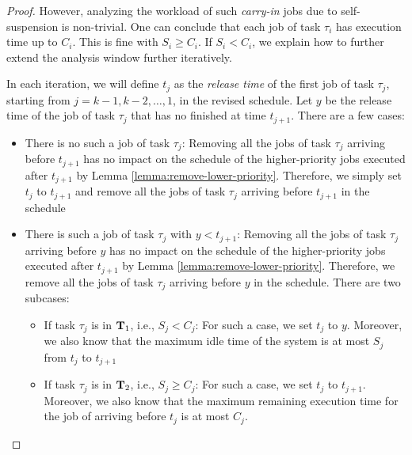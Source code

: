\begin{proof}
However, analyzing the workload of such \emph{carry-in} jobs due to self-suspension is non-trivial. One can conclude that each job of task $\tau_i$ has execution time up to $C_i$. This is fine with $S_i \geq C_i$. If $S_i < C_i$, we explain how to further extend the analysis window further iteratively. 


In each iteration, we will define $t_j$ as the \emph{release time} of the first job of task $\tau_j$, starting from $j=k-1, k-2, \ldots, 1$, in the revised schedule. Let $y$ be the release time of the job of task $\tau_j$ that has no finished at time $t_{j+1}$. There are a few cases:
\begin{itemize}
\item There is no such a job of task $\tau_j$: Removing all the jobs of task $\tau_j$ arriving before $t_{j+1}$ has no impact on the schedule of the higher-priority jobs executed after $t_{j+1}$ by Lemma \ref{lemma:remove-lower-priority}. Therefore, we simply set $t_j$ to $t_{j+1}$ and remove all the jobs of task $\tau_j$ arriving before $t_{j+1}$ in the schedule
\item There is such a job of task $\tau_j$ with $y < t_{j+1}$:  Removing all the jobs of task $\tau_j$ arriving before $y$ has no impact on the schedule of the higher-priority jobs executed after $t_{j+1}$ by Lemma \ref{lemma:remove-lower-priority}. Therefore, we remove all the jobs of task $\tau_j$ arriving before $y$ in the schedule. There are two subcases:
\begin{itemize}
\item If task $\tau_j$ is in ${\bf T}_1$, i.e., $S_j < C_j$: For such a case, we set $t_{j}$ to $y$. Moreover, we also know that the maximum idle time of the system is at most $S_j$ from $t_j$ to $t_{j+1}$
\item If task $\tau_j$ is in ${\bf T}_2$, i.e., $S_j \geq C_j$: For such a case, we set $t_{j}$ to $t_{j+1}$. Moreover, we also know that the maximum remaining execution time for the job of arriving before $t_{j}$ is at most $C_j$.
\end{itemize}
\end{itemize}
 
\end{proof}
  
  

  
  
  
  
  
  
  
  
  
  
  
  
  
  
  
  
  
  
  
  
